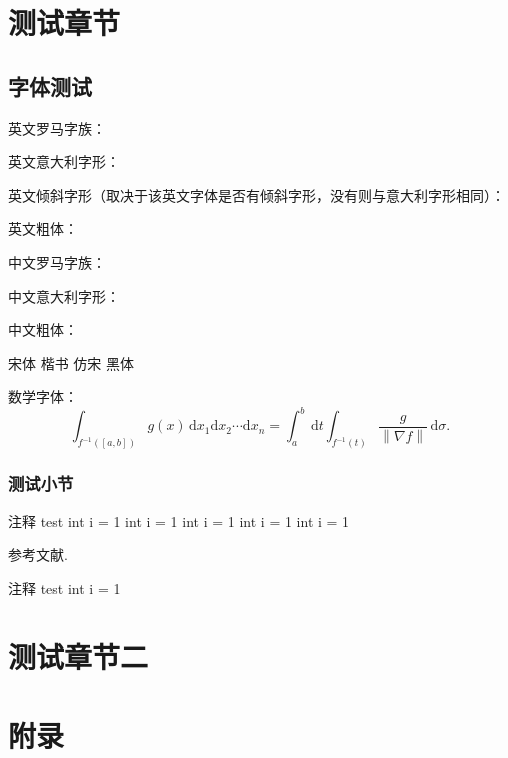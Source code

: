\documentclass[codepkg=listings,theme=fancy,twoside]{course-report}
\begin{document}
\chapter{测试章节}
\section{字体测试}

英文罗马字族：\\
\lipsum[1]

英文意大利字形：\\
{\itshape \lipsum[1] }

英文倾斜字形（取决于该英文字体是否有倾斜字形，没有则与意大利字形相同）：\\
{\slshape \lipsum[1]}

英文粗体：\\
{\bfseries \lipsum[1]}

中文罗马字族：\\
\zhlipsum[1]

中文意大利字形：\\
{\itshape \zhlipsum[1] }

中文粗体：\\
{\bfseries \zhlipsum[1] }

{\songti 宋体} {\kaishu 楷书} {\fangsong 仿宋} {\heiti 黑体}

数学字体：
\[
    \int_{f^{ - 1}([a,b])} g(x)\,\mathrm{d}x_1\mathrm{d}x_2\cdots\mathrm{d}x_n =\int_a^b\,\mathrm{d}t\int_{f^{ - 1}(t)}\frac{g}{\left\|\nabla f\right\|}\,\mathrm{d}\sigma.
\]

\subsection{测试小节}

\zhlipsum[1-2]\zhlipsum[1]
\begin{codebox}{注释 test}\label{box:1.1}
int i = 1 
int i = 1    
int i = 1    
int i = 1    
int i = 1    
\end{codebox}
参考文献.


\begin{codebox}{注释 test}\label{box:1.2}
    int i = 1    
\end{codebox}


\chapter{测试章节二}


\appendix
\chapter{附录}

\nocite{*}
\end{document}
